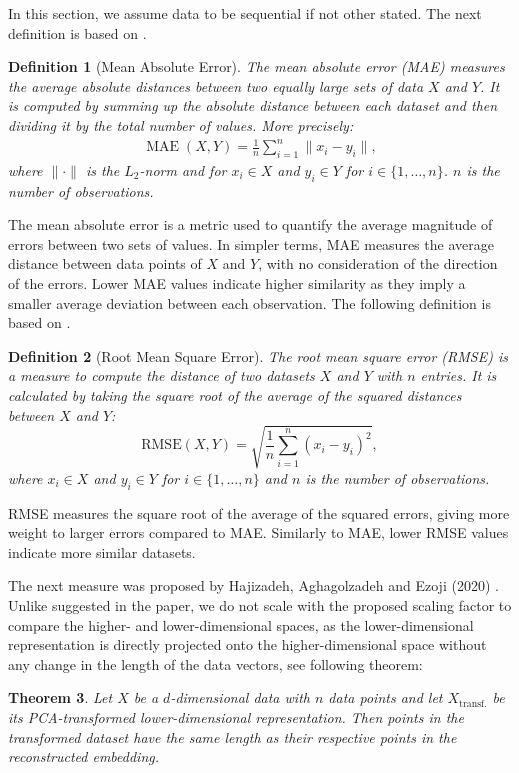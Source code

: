 \documentclass[pdftex,12pt,a4paper]{report}
\newtheorem{definition}{Definition}[section]
\newtheorem{theorem}[definition]{Theorem}
\begin{document}
In this section, we assume data to be sequential if not other stated.
The next definition is based on \cite{error-measures}.
\begin{definition}[Mean Absolute Error]
    The mean absolute error (MAE) measures the average absolute distances between two equally large sets of data $X$ and $Y$.
    It is computed by summing up the absolute distance between each dataset and then dividing it by the total number of values.
    More precisely:
    \begin{align*}
        \operatorname{MAE}(X, Y) = \frac{1}{n} \sum_{i=1}^n \| x_i - y_i \|,
    \end{align*}
    where $\| \cdot \| $ is the $L_2$-norm and for $x_i \in X$ and $y_i \in Y$ for $i \in \{1, \dots, n \}$. $n$ is the number of observations.
\end{definition}
The mean absolute error is a metric used to quantify the average magnitude of errors between two sets of values.
In simpler terms, MAE measures the average distance between data points of $X$ and $Y$, with no consideration of the direction of the errors.
Lower MAE values indicate higher similarity as they imply a smaller average deviation between each observation.
The following definition is based on \cite{error-measures}.
\begin{definition}[Root Mean Square Error]
    The root mean square error (RMSE) is a measure to compute the distance of two datasets $X$ and $Y$ with $n$ entries.
    It is calculated by taking the square root of the average of the squared distances between $X$ and $Y$:
    \begin{displaymath}
        \mathrm{RMSE}(X,Y) = \sqrt{\dfrac{1}{n} \sum_{i = 1}^{n}(x_i - y_i)^2},
    \end{displaymath}
    where $x_i \in X$ and $y_i \in Y$ for $ i \in \{1, \dots, n \}$ and $n$ is the number of observations.
\end{definition}
RMSE measures the square root of the average of the squared errors, giving more weight to larger errors compared to MAE.
Similarly to MAE, lower RMSE values indicate more similar datasets.

The next measure was proposed by Hajizadeh, Aghagolzadeh and Ezoji (2020) \cite{distance-measure}.
Unlike suggested in the paper, we do not scale with the proposed scaling factor to compare the higher- and lower-dimensional spaces, as the lower-dimensional representation is directly projected onto the higher-dimensional space without any change in the length of the data vectors, see following theorem:
\begin{theorem} \label{inv-transf-length}
    Let $X$ be a $d$-dimensional data with $n$ data points and let $X_{\mathrm{transf.}}$ be its PCA-transformed lower-dimensional representation.
    Then points in the transformed dataset have the same length as their respective points in the reconstructed embedding.
\end{theorem}
\end{document}
